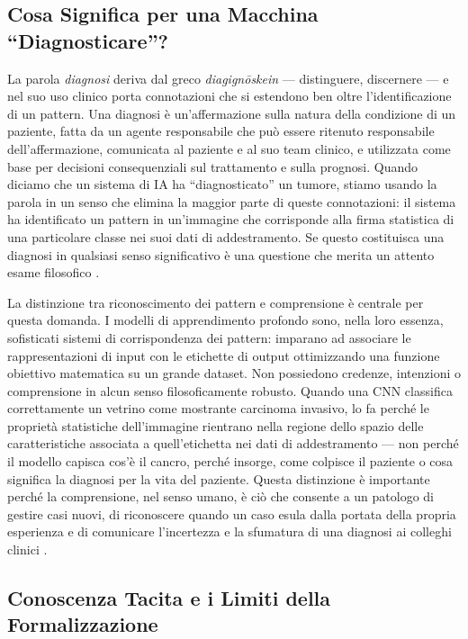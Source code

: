 \subsection{Cosa Significa per una Macchina ``Diagnosticare''?}

La parola \emph{diagnosi} deriva dal greco \emph{diagign\={o}skein} — distinguere, discernere — e nel suo uso clinico porta connotazioni che si estendono ben oltre l'identificazione di un pattern. Una diagnosi è un'affermazione sulla natura della condizione di un paziente, fatta da un agente responsabile che può essere ritenuto responsabile dell'affermazione, comunicata al paziente e al suo team clinico, e utilizzata come base per decisioni consequenziali sul trattamento e sulla prognosi. Quando diciamo che un sistema di IA ha ``diagnosticato'' un tumore, stiamo usando la parola in un senso che elimina la maggior parte di queste connotazioni: il sistema ha identificato un pattern in un'immagine che corrisponde alla firma statistica di una particolare classe nei suoi dati di addestramento. Se questo costituisca una diagnosi in qualsiasi senso significativo è una questione che merita un attento esame filosofico \cite{hanna2024}.

La distinzione tra riconoscimento dei pattern e comprensione è centrale per questa domanda. I modelli di apprendimento profondo sono, nella loro essenza, sofisticati sistemi di corrispondenza dei pattern: imparano ad associare le rappresentazioni di input con le etichette di output ottimizzando una funzione obiettivo matematica su un grande dataset. Non possiedono credenze, intenzioni o comprensione in alcun senso filosoficamente robusto. Quando una CNN classifica correttamente un vetrino come mostrante carcinoma invasivo, lo fa perché le proprietà statistiche dell'immagine rientrano nella regione dello spazio delle caratteristiche associata a quell'etichetta nei dati di addestramento — non perché il modello capisca cos'è il cancro, perché insorge, come colpisce il paziente o cosa significa la diagnosi per la vita del paziente. Questa distinzione è importante perché la comprensione, nel senso umano, è ciò che consente a un patologo di gestire casi nuovi, di riconoscere quando un caso esula dalla portata della propria esperienza e di comunicare l'incertezza e la sfumatura di una diagnosi ai colleghi clinici \cite{song2023}.

\subsection{Conoscenza Tacita e i Limiti della Formalizzazione}

